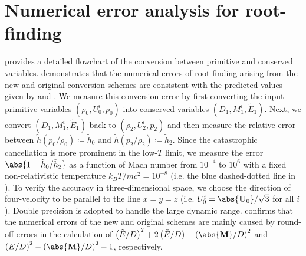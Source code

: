 \section{Numerical error analysis for root-finding}
\label{Appendix:Numerical error analysis}
 provides a detailed flowchart of the conversion between primitive and conserved variables.  demonstrates that the numerical errors of root-finding arising from the new and original conversion schemes are consistent with the predicted values given by  and . We measure this conversion error by first converting the input primitive variables $(\rho_0, U^{i}_0, p_0)$ into conserved variables $(D_1, M^{i}_1, \tilde{E}_1)$. Next, we convert $(D_1, M^{i}_1, \tilde{E}_1)$ back to $(\rho_2, U^{i}_2, p_2)$ and then measure the relative error between $\tilde{h}(p_0/\rho_0)\coloneqq\tilde{h}_{0}$ and $\tilde{h}(p_2/\rho_2)\coloneqq\tilde{h}_{2}$. Since the catastrophic cancellation is more prominent in the low-$T$ limit, we measure the error $\abs{1-\tilde{h}_{0}/\tilde{h}_{2}}$ as a function of Mach number from $10^{-4}$ to $10^{6}$ with a fixed non-relativistic temperature $k_{B}T/mc^2=10^{-8}$ (i.e. the blue dashed-dotted line in ). To verify the accuracy in three-dimensional space, we choose the direction of four-velocity to be parallel to the line $x=y=z$ (i.e. $U^i_0=\abs{\mathbf{U}_0}/\sqrt{3}$ for all $i$). Double precision is adopted to handle the large dynamic range.  confirms that the numerical errors of the new and original schemes are mainly caused by round-off errors in the calculation of $\left(\tilde{E}/D\right)^2+2\left(\tilde{E}/D\right)-\left(\abs{\mathbf{M}}/D\right)^2$ and $\left(E/D\right)^2-\left(\abs{\mathbf{M}}/D\right)^2-1$, respectively.




